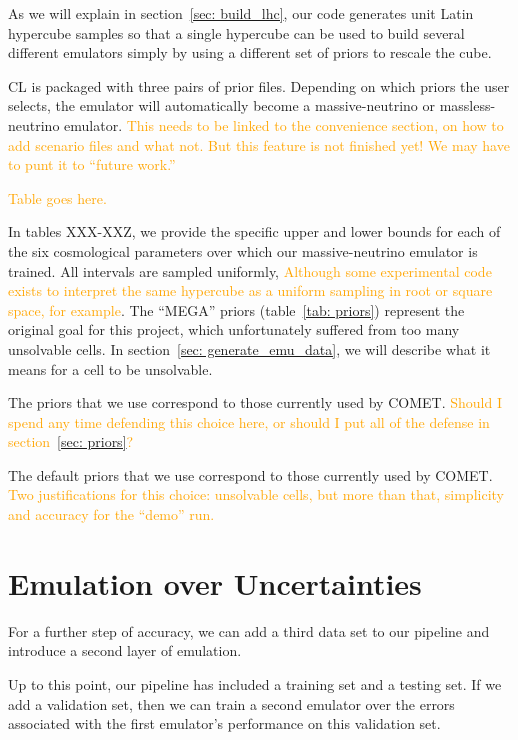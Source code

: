As we will explain in section~\ref{sec: build_lhc}, our code generates unit 
Latin hypercube samples so that a single hypercube can be used to build 
several different emulators simply by using a different set of priors to 
rescale the cube.

CL is packaged with three pairs of prior files. Depending on which priors the user selects,
the emulator will automatically become a massive-neutrino or massless-neutrino emulator.
\textcolor{orange}{This needs to be linked to the convenience section, on how to add scenario files and what
not. But this feature is not finished yet! We may have to punt it to “future work.”}

\textcolor{orange}{Table goes here.}

In tables XXX-XXZ, we provide the specific upper and lower bounds for each of
the six cosmological parameters over which our massive-neutrino emulator is 
trained. All intervals are sampled uniformly, \textcolor{orange}{Although some
experimental code exists to interpret the same hypercube as a uniform sampling
in root or square space, for example}. The ``MEGA'' priors 
(table~\ref{tab: priors}) represent the original goal for this project, which 
unfortunately suffered from too many unsolvable cells. In
section~\ref{sec: generate_emu_data}, we will describe what it means for a 
cell to be unsolvable.

The priors that we use correspond to those currently used by COMET. \textcolor{orange}{Should I spend any time defending this choice here, or should I put all of the defense in section~\ref{sec: priors}?}

The default priors that we use correspond to those currently used by COMET. \textcolor{orange}{Two
justifications for this choice: unsolvable cells, but more than that, simplicity and accuracy
for the ``demo'' run.}

\section{Emulation over Uncertainties}

For a further step of accuracy, we can add a third data set to our pipeline
and introduce a second layer of emulation.

Up to this point, our pipeline has included a training set and a testing set.
If we add a validation set, then we can train a second emulator over the
errors associated with the first emulator's performance on this validation
set.


